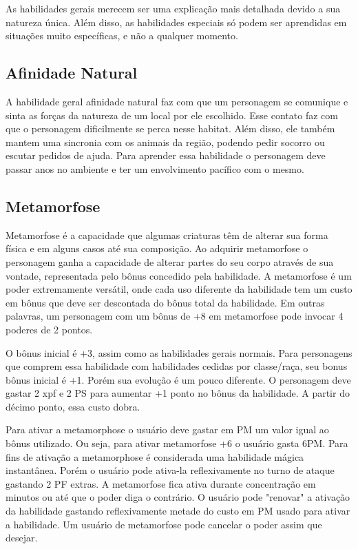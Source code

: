 As habilidades gerais merecem ser uma explicação mais detalhada devido a sua natureza única. Além disso, as habilidades especiais só podem ser aprendidas em situações muito específicas, e não a qualquer momento.

\subsection{Afinidade Natural}
 A habilidade geral afinidade natural faz com que um personagem se comunique e sinta as forças da natureza de um local por ele escolhido. Esse contato faz com que o personagem dificilmente se perca nesse habitat. Além disso, ele também mantem uma sincronia com os animais da região, podendo pedir socorro ou escutar pedidos de ajuda. Para aprender essa habilidade o personagem deve passar anos no ambiente e ter um envolvimento pacífico com o mesmo.
 
 
 \subsection{Metamorfose}
 
 Metamorfose é a capacidade que algumas criaturas têm de alterar sua forma física e em alguns casos até sua composição. Ao adquirir metamorfose o personagem ganha a capacidade de alterar partes do seu corpo através de sua vontade, representada pelo bônus concedido pela habilidade. A metamorfose é um poder extremamente versátil, onde cada uso diferente da habilidade tem um custo em bônus que deve ser descontada do bônus total da habilidade. Em outras palavras, um personagem com um bônus de +8 em metamorfose pode invocar 4 poderes de 2 pontos. 

O bônus inicial é +3, assim como as habilidades gerais normais. Para personagens que comprem essa habilidade com habilidades cedidas por classe/raça, seu bonus bônus inicial é +1. Porém sua evolução é um pouco diferente. O personagem deve gastar 2 xpf e 2 PS para aumentar +1 ponto no bônus da habilidade. A partir do décimo ponto, essa custo dobra.

Para ativar a metamorphose o usuário deve gastar em PM um valor igual ao bônus utilizado. Ou seja, para ativar metamorfose +6 o usuário gasta 6PM. Para fins de ativação a metamorphose é considerada uma habilidade mágica instantânea. Porém o usuário pode ativa-la reflexivamente no turno de ataque gastando 2 PF extras. A metamorfose fica ativa durante concentração em minutos ou até que o poder diga o contrário. O usuário pode "renovar" a ativação da habilidade gastando reflexivamente metade do custo em PM usado para ativar a habilidade. Um usuário de metamorfose pode cancelar o poder assim que desejar.


